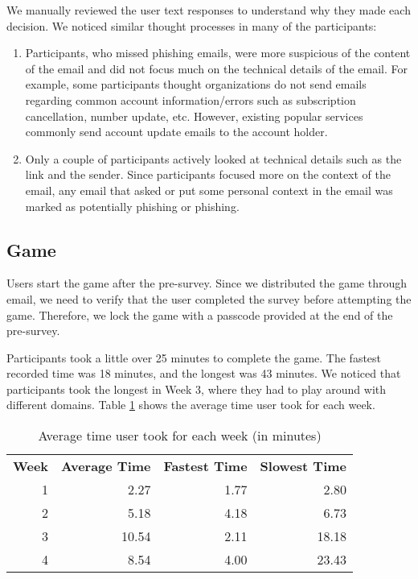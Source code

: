 We manually reviewed the user text responses to understand why they made each decision. We noticed similar thought processes in many of the participants:

\begin{enumerate}
    \item Participants, who missed phishing emails, were more suspicious of the content of the email and did not focus much on the technical details of the email. For example, some participants thought organizations do not send emails regarding common account information/errors such as subscription cancellation, number update, etc. However, existing popular services commonly send account update emails to the account holder.
    \item Only a couple of participants actively looked at technical details such as the link and the sender. Since participants focused more on the context of the email, any email that asked or put some personal context in the email was marked as potentially phishing or phishing.
\end{enumerate}

\subsection{Game}
Users start the game after the pre-survey. Since we distributed the game through email, we need to verify that the user completed the survey before attempting the game. Therefore, we lock the game with a passcode provided at the end of the pre-survey.

Participants took a little over 25 minutes to complete the game. The fastest recorded time was 18 minutes, and the longest was 43 minutes. We noticed that participants took the longest in Week 3, where they had to play around with different domains. Table \ref{tab:game_time} shows the average time user took for each week.

\begin{table}[!ht]
    \centering
    \begin{tabular}{r r r r }
        \hline
        \textbf{Week} & \textbf{Average Time} & \textbf{Fastest Time} & \textbf{Slowest Time} \\
        1             & 2.27                  & 1.77                  & 2.80                  \\
        2             & 5.18                  & 4.18                  & 6.73                  \\
        3             & 10.54                 & 2.11                  & 18.18                 \\
        4             & 8.54                  & 4.00                  & 23.43                 \\
        \hline
    \end{tabular}
    \caption{Average time user took for each week (in minutes)}
    \label{tab:game_time}
\end{table}

